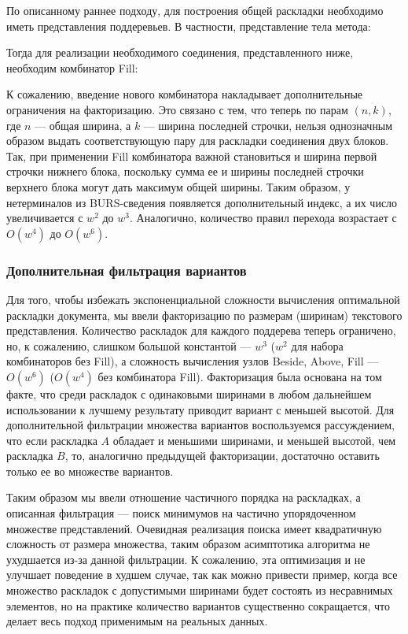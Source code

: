 

По описанному раннее подходу, для построения общей раскладки необходимо иметь представления
поддеревьев. В частности, представление тела метода:



Тогда для реализации необходимого соединения, представленного ниже, необходим комбинатор Fill:



К сожалению, введение нового комбинатора накладывает дополнительные ограничения на
факторизацию. Это связано с тем, что теперь по парам $(n, k)$, где $n$ --- общая ширина,
а $k$ --- ширина последней строчки, нельзя однозначным образом выдать соответствующую
пару для раскладки соединения двух блоков. Так, при применении Fill комбинатора
важной становиться и ширина первой строчки нижнего блока, поскольку сумма ее и ширины
последней строчки верхнего блока могут дать максимум общей ширины. Таким образом,
у нетерминалов из BURS-сведения появляется дополнительный индекс, а их число
увеличивается с $w^2$ до $w^3$. Аналогично, количество правил перехода возрастает
с $O(w^4)$ до $O(w^6)$.

\subsubsection{Дополнительная фильтрация вариантов}

Для того, чтобы избежать экспоненциальной сложности вычисления оптимальной
раскладки документа, мы ввели факторизацию по размерам (ширинам) текстового
представления.
Количество раскладок для каждого поддерева теперь ограничено, но, к сожалению,
слишком большой константой --- $w^3$ ($w^2$ для набора комбинаторов без
Fill), а сложность вычисления узлов Beside, Above, Fill --- $O(w^6)$
($O(w^4)$ без комбинатора Fill). Факторизация была основана на том факте, что
среди раскладок с одинаковыми ширинами в любом дальнейшем использовании
к лучшему результату приводит вариант с меньшей высотой.
Для дополнительной фильтрации множества
вариантов воспользуемся рассуждением, что если раскладка $A$ обладает и
меньшими ширинами, и меньшей высотой, чем раскладка $B$, то, аналогично
предыдущей факторизации,
достаточно оставить только ее во множестве вариантов.

Таким образом мы ввели отношение частичного порядка на раскладках, а
описанная фильтрация --- поиск минимумов на частично упорядоченном
множестве представлений\cite{poset}.
Очевидная реализация поиска имеет квадратичную сложность от размера множества,
таким образом асимптотика алгоритма не ухудшается из-за данной фильтрации.
К сожалению, эта оптимизация и не улучшает поведение
в худшем случае, так как
можно привести пример, когда все множество раскладок с допустимыми ширинами
будет состоять из несравнимых элементов, но на практике количество вариантов
существенно сокращается, что делает весь подход применимым на реальных данных.

